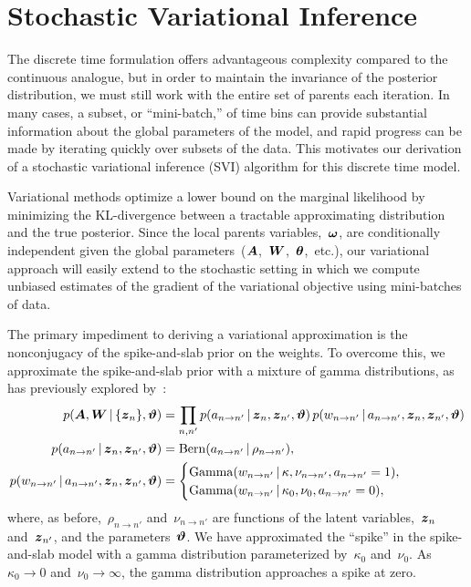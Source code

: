 \section{Stochastic Variational Inference}
The discrete time formulation offers advantageous complexity compared
to the continuous analogue, but in order to maintain the invariance of
the posterior distribution, we must still work with the entire set of
parents each iteration. In many cases, a subset, or ``mini-batch,'' of
time bins can provide substantial information about the global
parameters of the model, and rapid progress can be made by iterating
quickly over subsets of the data. This motivates our derivation of a
stochastic variational inference (SVI) algorithm for this discrete
time model.

Variational methods optimize a lower bound on the marginal likelihood
by minimizing the KL-divergence between a tractable approximating
distribution and the true posterior. Since the local parents
variables,~$\boldsymbol{\omega}$, are conditionally independent given the global
parameters~($\boldsymbol{A}$,~$\boldsymbol{W}$,~$\boldsymbol{\theta}$,~etc.), our variational approach will
easily extend to the stochastic setting in which we compute unbiased
estimates of the gradient of the variational objective using
mini-batches of data.

The primary impediment to deriving a variational approximation is the
nonconjugacy of the spike-and-slab prior on the weights.  To overcome
this, we approximate the spike-and-slab prior with a mixture of gamma
distributions, as has previously explored by~\citet{Grabska-2013}:
\begin{align*}
  p(\boldsymbol{A}, \boldsymbol{W} \,|\, \{\boldsymbol{z}_n\}, \boldsymbol{\vartheta})
  &= \prod_{n,n'} p(a_{n \to n'} \,|\, \boldsymbol{z}_n, \boldsymbol{z}_{n'}, \boldsymbol{\vartheta}) \, p(w_{n \to n'} \,|\, a_{n \to n'}, \boldsymbol{z}_n, \boldsymbol{z}_{n'}, \boldsymbol{\vartheta}) \\
  p(a_{n \to n'} \,|\, \boldsymbol{z}_n, \boldsymbol{z}_{n'}, \boldsymbol{\vartheta}) &= \mathrm{Bern}(a_{n \to n'} \,|\, \rho_{n \to n'}), \\
  p(w_{n \to n'} \,|\, a_{n \to n'}, \boldsymbol{z}_n, \boldsymbol{z}_{n'}, \boldsymbol{\vartheta})
  &=
  \begin{cases} 
    \mathrm{Gamma}(w_{n \to n'} \,|\, \kappa, \nu_{n \to n'}, a_{n \to n'} =1), \\
    \mathrm{Gamma}(w_{n \to n'} \,|\, \kappa_0, \nu_0, a_{n \to n'} =0),
  \end{cases}
\end{align*}
where, as before,~$\rho_{n \to n'}$ and~$\nu_{n \to n'}$ are functions
of the latent variables,~$\boldsymbol{z}_n$ and~$\boldsymbol{z}_{n'}$, and the
parameters~$\boldsymbol{\vartheta}$.  We have approximated the ``spike'' in the
spike-and-slab model with a gamma distribution parameterized
by~$\kappa_0$ and~$\nu_0$.  As~$\kappa_0 \to 0$ and~$\nu_0\to \infty$,
the gamma distribution approaches a spike at zero.

